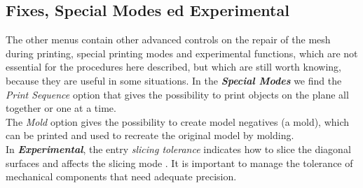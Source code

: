 \subsection{Fixes, Special Modes ed Experimental}
The other menus contain other advanced controls on the repair of the mesh during printing, special printing modes and experimental functions, which are not essential for the procedures here described, but which are still worth knowing, because they are useful in some situations.
In the \emph{\textbf{Special Modes}} we find the \emph{Print Sequence} option that gives the possibility to print objects on the plane all together or one at a time. \\
The \emph{Mold} option gives the possibility to create model negatives (a mold), which can be printed and used to recreate the original model by molding. \\
In \emph{\textbf{Experimental}}, the entry \emph{slicing tolerance} indicates how to slice the diagonal surfaces and affects the slicing mode \parencite{Reference56}. It is important to manage the tolerance of mechanical components that need adequate precision.
